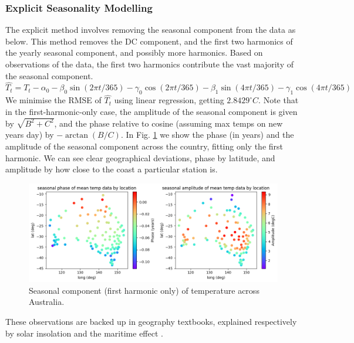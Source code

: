 \documentclass[12pt,a4paper]{article} %
\begin{document}
\subsubsection{Explicit Seasonality Modelling}
\label{subsec:seasonality}
The explicit method involves removing the seasonal component from the data as below. This method removes the DC component, and the first two harmonics of the yearly seasonal component, and possibly more harmonics. Based on observations of the data, the first two harmonics contribute the vast majority of the seasonal component.
\[
    \hat{T_t}=T_t-\alpha_0-\beta_0\sin(2\pi t/365)-\gamma_0\cos(2\pi t/365)-\beta_1\sin(4\pi t/365)-\gamma_1\cos(4\pi t/365)
\]
We minimise the RMSE of $\hat{T_t}$ using linear regression, getting $2.8429^\circ C$. Note that in the first-harmonic-only case, the amplitude of the seasonal component is given by $\sqrt{B^2+C^2}$, and the phase relative to cosine (assuming max temps on new years day) by $-\arctan(B/C)$. In Fig. \ref{fig:sin_adj} we show the phase (in years) and the amplitude of the seasonal component across the country, fitting only the first harmonic. We can see clear geographical deviations, phase by latitude, and amplitude by how close to the coast a particular station is.
\begin{figure}[!ht]
    \centering
    \includegraphics[width=\linewidth]{mean_params_by_loc.png}
    \caption{Seasonal component (first harmonic only) of temperature across Australia.}
    \label{fig:sin_adj}
\end{figure}
These observations are backed up in geography textbooks, explained respectively by solar insolation and the maritime effect \cite{roger}.
\end{document}
